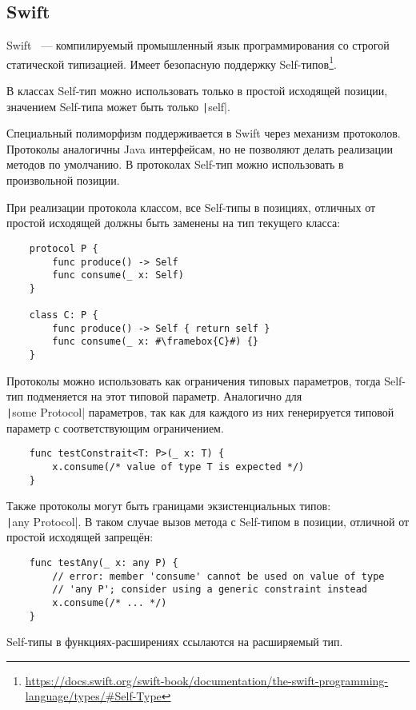 \subsection{Swift} \label{subsec:swift}

Swift~\cite{goodwill2015swift} --- компилируемый промышленный язык программирования со строгой статической типизацией.
Имеет безопасную поддержку Self-типов\footnote{\url{https://docs.swift.org/swift-book/documentation/the-swift-programming-language/types/\#Self-Type}}.

В классах Self-тип можно использовать только в простой исходящей позиции, значением Self-типа может быть только \texttt|self|.

Специальный полиморфизм поддерживается в Swift через механизм протоколов.
Протоколы аналогичны Java интерфейсам, но не позволяют делать реализации методов по умолчанию.
В протоколах Self-тип можно использовать в произвольной позиции.

При реализации протокола классом, все Self-типы в позициях, отличных от простой исходящей должны быть заменены на тип текущего класса:

\begin{verbatim}
    protocol P {
        func produce() -> Self
        func consume(_ x: Self)
    }

    class C: P {
        func produce() -> Self { return self }
        func consume(_ x: #\framebox{C}#) {}
    }
\end{verbatim}

Протоколы можно использовать как ограничения типовых параметров, тогда Self-тип подменяется на этот типовой параметр.
Аналогично для \\\texttt|some Protocol| параметров, так как для каждого из них генерируется типовой параметр с соответствующим ограничением.

\begin{verbatim}
    func testConstrait<T: P>(_ x: T) {
        x.consume(/* value of type T is expected */)
    }
\end{verbatim}

Также протоколы могут быть границами экзистенциальных типов: \\\texttt|any Protocol|.
В таком случае вызов метода с Self-типом в позиции, отличной от простой исходящей запрещён:

\begin{verbatim}
    func testAny(_ x: any P) {
        // error: member 'consume' cannot be used on value of type
        // 'any P'; consider using a generic constraint instead
        x.consume(/* ... */)
    }
\end{verbatim}

Self-типы в функциях-расширениях ссылаются на расширяемый тип.
